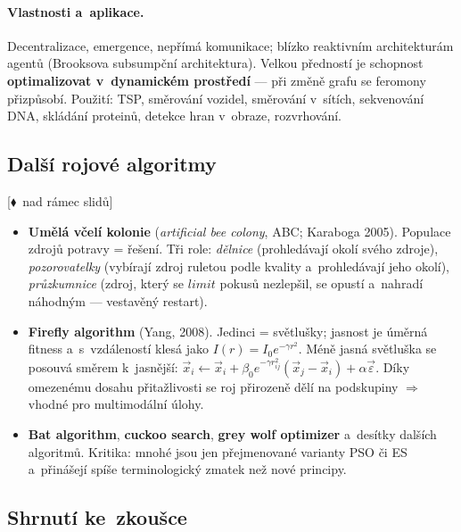 \documentclass[11pt,a4paper]{article}
\theoremstyle{definition}
\newcommand{\mimo}{\textcolor{markcol}{\textsf{\footnotesize[$\blacklozenge$~nad rámec slidů]}}}
\begin{document}
\paragraph{Vlastnosti a~aplikace.} Decentralizace, emergence, nepřímá
komunikace; blízko reaktivním architekturám agentů (Brooksova subsumpční
architektura). Velkou předností je schopnost \textbf{optimalizovat
v~dynamickém prostředí} --- při změně grafu se feromony přizpůsobí.
Použití: TSP, směrování vozidel, směrování v~sítích, sekvenování DNA,
skládání proteinů, detekce hran v~obraze, rozvrhování.

\subsection{Další rojové algoritmy}

\noindent\mimo{}

\begin{itemize}
\item \textbf{Umělá včelí kolonie} (\emph{artificial bee colony}, ABC;
  Karaboga 2005). Populace zdrojů potravy = řešení. Tři role:
  \emph{dělnice} (prohledávají okolí svého zdroje),
  \emph{pozorovatelky} (vybírají zdroj ruletou podle kvality a~prohledávají
  jeho okolí),
  \emph{průzkumnice} (zdroj, který se $limit$ pokusů nezlepšil, se opustí
  a~nahradí náhodným --- vestavěný restart).
\item \textbf{Firefly algorithm} (Yang, 2008). Jedinci = světlušky; jasnost je
  úměrná fitness a~s~vzdáleností klesá jako
  $I(r) = I_0 e^{-\gamma r^2}$. Méně jasná světluška se posouvá směrem
  k~jasnější:
  $\vec x_i \gets \vec x_i + \beta_0 e^{-\gamma r_{ij}^2}(\vec x_j - \vec x_i)
  + \alpha \vec\varepsilon$. Díky omezenému dosahu přitažlivosti se roj
  přirozeně dělí na podskupiny $\Rightarrow$ vhodné pro multimodální úlohy.
\item \textbf{Bat algorithm}, \textbf{cuckoo search}, \textbf{grey wolf
  optimizer} a~desítky dalších  algoritmů. Kritika:
  mnohé jsou jen přejmenované varianty PSO či ES a~přinášejí spíše
  terminologický zmatek než nové principy.
\end{itemize}

\subsection{Shrnutí ke~zkoušce}
\end{document}
